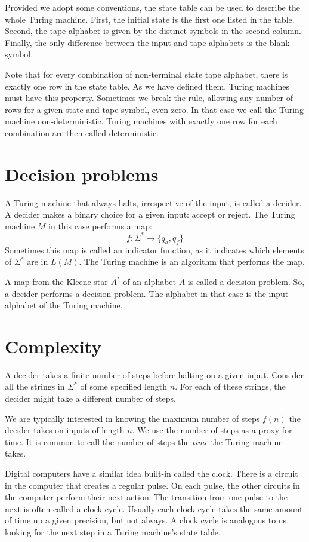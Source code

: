 \documentclass{iansnotes}
\begin{document}
  Provided we adopt some conventions, the state table can be used to describe the whole Turing machine.
  First, the initial state is the first one listed in the table.
  Second, the tape alphabet is given by the distinct symbols in the second column.
  Finally, the only difference between the input and tape alphabets is the blank symbol.
  
  Note that for every combination of non-terminal state tape alphabet, there is exactly one row in the state table.
  As we have defined them, Turing machines must have this property.
  Sometimes we break the rule, allowing any number of rows for a given state and tape symbol, even zero.
  In that case we call the Turing machine non-deterministic.
  Turing machines with exactly one row for each combination are then called deterministic.


\section{Decision problems}
  A Turing machine that always halts, irrespective of the input, is called a decider.  
  A decider makes a binary choice for a given input: accept or reject.
  The Turing machine $M$ in this case performs a map:
  \[ f:\Sigma^* \rightarrow \{ q_a, q_f \} \]
  Sometimes this map is called an indicator function, as it indicates which elements of $\Sigma^*$ are in $L(M)$.
  The Turing machine is an algorithm that performs the map.
  
  A map from the Kleene star $A^*$ of an alphabet $A$ is called a decision problem.
  So, a decider performs a decision problem.
  The alphabet in that case is the input alphabet of the Turing machine.


\section{Complexity}
  A decider takes a finite number of steps before halting on a given input.
  Consider all the strings in $\Sigma^*$ of some specified length $n$.
  For each of these strings, the decider might take a different number of steps.

  We are typically interested in knowing the maximum number of steps $f(n)$ the decider takes on inputs of length $n$.
  We use the number of steps as a proxy for time.
  It is common to call the number of steps the \emph{time} the Turing machine takes.

  Digital computers have a similar idea built-in called the clock.
  There is a circuit in the computer that creates a regular pulse.
  On each pulse, the other circuits in the computer perform their next action.
  The transition from one pulse to the next is often called a clock cycle.
  Usually each clock cycle takes the same amount of time up a given precision, but not always.
  A clock cycle is analogous to us looking for the next step in a Turing machine's state table.
  
\end{document}
